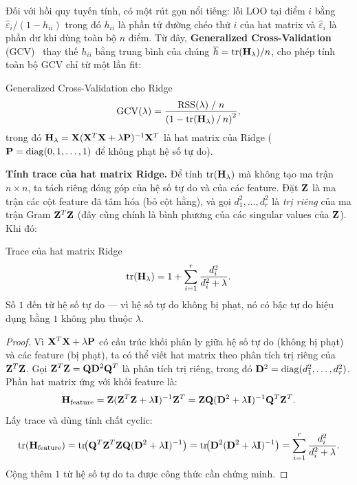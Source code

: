 Đối với hồi quy tuyến tính, có một rút gọn nổi tiếng: lỗi LOO tại điểm $i$ bằng
$\hat{\varepsilon}_i / (1 - h_{ii})$ trong đó $h_{ii}$ là phần tử đường chéo thứ
$i$ của hat matrix và $\hat{\varepsilon}_i$ là phần dư khi dùng toàn bộ $n$ điểm.
Từ đây, \textbf{Generalized Cross-Validation} (GCV)~\cite{golub1979} thay thế
$h_{ii}$ bằng trung bình của chúng $\overline{h} = \operatorname{tr}(\mathbf{H}_\lambda)/n$,
cho phép tính toàn bộ GCV chỉ từ một lần fit:

\begin{mydef}{Generalized Cross-Validation cho Ridge}{}
\[
    \operatorname{GCV}(\lambda)
    = \frac{\operatorname{RSS}(\lambda) \;/\; n}
           {\left(1 - \operatorname{tr}(\mathbf{H}_{\lambda})\,/\, n\right)^{2}},
\]
trong đó $\mathbf{H}_\lambda = \mathbf{X}(\mathbf{X}^T\mathbf{X} + \lambda\mathbf{P})^{-1}\mathbf{X}^T$
là hat matrix của Ridge ($\mathbf{P} = \operatorname{diag}(0,1,\ldots,1)$ để không
phạt hệ số tự do).
\end{mydef}

\noindent\textbf{Tính trace của hat matrix Ridge.}\quad
Để tính $\operatorname{tr}(\mathbf{H}_\lambda)$ mà không tạo ma trận $n \times n$,
ta tách riêng đóng góp của hệ số tự do và của các feature. Đặt $\mathbf{Z}$ là ma
trận các cột feature đã tâm hóa (bỏ cột hằng), và gọi $d_1^2, \ldots, d_r^2$
là \textit{trị riêng} của ma trận Gram $\mathbf{Z}^T\mathbf{Z}$ (đây cũng chính là
bình phương của các singular values của $\mathbf{Z}$). Khi đó:

\begin{myprop}{Trace của hat matrix Ridge}{}
\[
    \operatorname{tr}(\mathbf{H}_\lambda)
    = 1 + \sum_{i=1}^{r} \frac{d_i^2}{d_i^2 + \lambda}.
\]
Số $1$ đến từ hệ số tự do --- vì hệ số tự do không bị phạt, nó có bậc tự do hiệu dụng
bằng $1$ không phụ thuộc $\lambda$.
\end{myprop}

\begin{proof}
Vì $\mathbf{X}^T\mathbf{X} + \lambda\mathbf{P}$ có cấu trúc khối phân ly giữa hệ số tự do
(không bị phạt) và các feature (bị phạt), ta có thể viết hat matrix theo phân tích
trị riêng của $\mathbf{Z}^T\mathbf{Z}$. Gọi $\mathbf{Z}^T\mathbf{Z} = \mathbf{Q}\mathbf{D}^2\mathbf{Q}^T$
là phân tích trị riêng, trong đó $\mathbf{D}^2 = \operatorname{diag}(d_1^2,\ldots,d_r^2)$.
Phần hat matrix ứng với khối feature là:
\[
    \mathbf{H}_{\text{feature}} = \mathbf{Z}(\mathbf{Z}^T\mathbf{Z} + \lambda\mathbf{I})^{-1}\mathbf{Z}^T
    = \mathbf{Z}\mathbf{Q}(\mathbf{D}^2 + \lambda\mathbf{I})^{-1}\mathbf{Q}^T\mathbf{Z}^T.
\]
Lấy trace và dùng tính chất cyclic:
\[
    \operatorname{tr}(\mathbf{H}_{\text{feature}})
    = \operatorname{tr}\!\bigl(\mathbf{Q}^T\mathbf{Z}^T\mathbf{Z}\mathbf{Q}(\mathbf{D}^2+\lambda\mathbf{I})^{-1}\bigr)
    = \operatorname{tr}\!\bigl(\mathbf{D}^2(\mathbf{D}^2+\lambda\mathbf{I})^{-1}\bigr)
    = \sum_{i=1}^{r}\frac{d_i^2}{d_i^2+\lambda}.
\]
Cộng thêm $1$ từ hệ số tự do ta được công thức cần chứng minh.
\end{proof}

